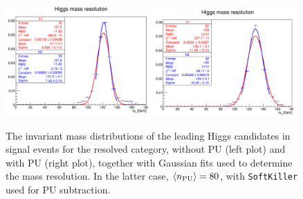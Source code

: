 \begin{figure}[t]
  \begin{center}
    \vspace{-1cm}
  \includegraphics[width=0.49\textwidth]{plots/higgs_mass_res_noPU.pdf}
  \includegraphics[width=0.49\textwidth]{plots/higgs_mass_res_PU80.pdf}
  \caption{\small The invariant mass distributions of the leading
    Higgs candidates in signal events for the resolved category, without
    PU (left plot) and with PU (right plot),
    together with Gaussian fits  used to determine the mass resolution.
    In the latter case, $\left\langle n_{\rm PU}\right\rangle=80$, with {\tt SoftKiller}
     used for PU subtraction.
}
\label{fig:higgs-mass-resolution}
\end{center}
\end{figure}




